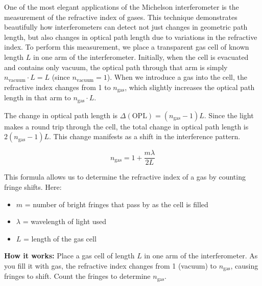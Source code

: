 \documentclass[
  a4paper,
]{book}
\providecommand{\tightlist}{%
  \setlength{\itemsep}{0pt}\setlength{\parskip}{0pt}}
\begin{document}
One of the most elegant applications of the Michelson interferometer is
the measurement of the refractive index of gases. This technique
demonstrates beautifully how interferometers can detect not just changes
in geometric path length, but also changes in optical path length due to
variations in the refractive index. To perform this measurement, we
place a transparent gas cell of known length \(L\) in one arm of the
interferometer. Initially, when the cell is evacuated and contains only
vacuum, the optical path through that arm is simply
\(n_{\text{vacuum}} \cdot L = L\) (since \(n_{\text{vacuum}} = 1\)).
When we introduce a gas into the cell, the refractive index changes from
1 to \(n_{\text{gas}}\), which slightly increases the optical path
length in that arm to \(n_{\text{gas}} \cdot L\).

The change in optical path length is
\(\Delta(\text{OPL}) = (n_{\text{gas}} - 1)L\). Since the light makes a
round trip through the cell, the total change in optical path length is
\(2(n_{\text{gas}} - 1)L\). This change manifests as a shift in the
interference pattern.

\begin{tcolorbox}[enhanced jigsaw, breakable, toptitle=1mm, bottomrule=.15mm, colbacktitle=quarto-callout-important-color!10!white, title=\textcolor{quarto-callout-important-color}{\faExclamation}\hspace{0.5em}{Gas Refractive Index Measurement Formula}, arc=.35mm, rightrule=.15mm, bottomtitle=1mm, opacityback=0, toprule=.15mm, coltitle=black, leftrule=.75mm, opacitybacktitle=0.6, colback=white, left=2mm, titlerule=0mm, colframe=quarto-callout-important-color-frame]

\[n_{\text{gas}} = 1 + \frac{m\lambda}{2L}\]

This formula allows us to determine the refractive index of a gas by
counting fringe shifts. Here:

\begin{itemize}
\tightlist
\item
  \(m\) = number of bright fringes that pass by as the cell is filled
\item
  \(\lambda\) = wavelength of light used
\item
  \(L\) = length of the gas cell
\end{itemize}

\textbf{How it works:} Place a gas cell of length \(L\) in one arm of
the interferometer. As you fill it with gas, the refractive index
changes from 1 (vacuum) to \(n_{\text{gas}}\), causing fringes to shift.
Count the fringes to determine \(n_{\text{gas}}\).

\end{tcolorbox}
\end{document}
